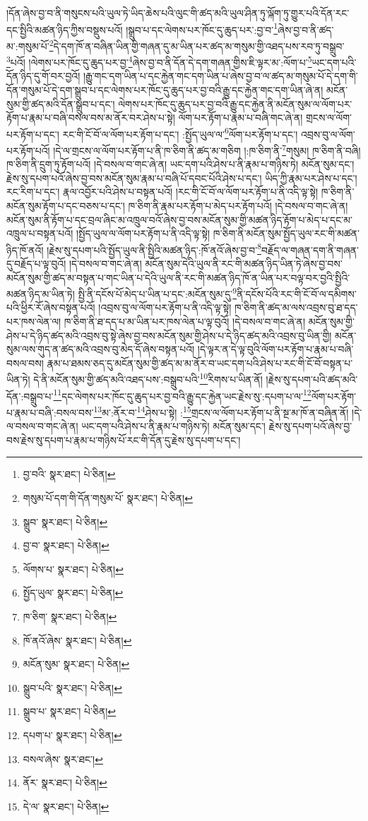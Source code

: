 །དོན་ཞེས་བྱ་བ་ནི་གསུངས་པའི་ཡུལ་ཏེ་ཡིད་ཆེས་པའི་ལུང་གི་ཚད་མའི་ཡུལ་ཤིན་ཏུ་ལྐོག་ཏུ་གྱུར་པའི་དོན་རང་དང་སྤྱིའི་མཚན་ཉིད་ཀྱིས་བསྡུས་པའོ། །སྒྲུབ་པ་དང་ལེགས་པར་ཁོང་དུ་ཆུད་པར་:བྱ་བ་\footnote{བྱ་བའི་  སྣར་ཐང་།  པེ་ཅིན། }ཞེས་བྱ་བ་ནི་ཚད་མ་:གསུམ་པོ་\footnote{གསུམ་པོ་དག་གི་དོན་གསུམ་པོ་  སྣར་ཐང་།  པེ་ཅིན། }དེ་དག་ཁོ་ན་བཞིན་ཡིན་གྱི་གཞན་དུ་མ་ཡིན་པར་ཚད་མ་གསུམ་གྱི་འཐད་པས་རབ་ཏུ་བསྒྲུབ་\footnote{སྒྲུབ་  སྣར་ཐང་།  པེ་ཅིན། }པའོ། །ལེགས་པར་ཁོང་དུ་ཆུད་པར་བྱ་\footnote{བྱ་བ་  སྣར་ཐང་།  པེ་ཅིན། }ཞེས་བྱ་བ་ནི་དོན་དེ་དག་གཞན་གྱིས་ཇི་ལྟར་མ་:ལོག་པ་\footnote{ལོགས་པ་  སྣར་ཐང་།  པེ་ཅིན། }ཡང་དག་པའི་དོན་ཉིད་དུ་གོ་བར་བྱའོ། །རྒྱུ་གང་དག་ཡིན་པ་དང་རྐྱེན་གང་དག་ཡིན་པ་ཞེས་བྱ་བ་ལ་ཚད་མ་གསུམ་པོ་དེ་དག་གི་དོན་གསུམ་པོ་དེ་དག་སྒྲུབ་པ་དང་ལེགས་པར་ཁོང་དུ་ཆུད་པར་བྱ་བའི་རྒྱུ་དང་རྐྱེན་གང་དག་ཡིན་ཞེ་ན། མངོན་སུམ་གྱི་ཚད་མའི་དོན་སྒྲུབ་པ་དང་། ལེགས་པར་ཁོང་དུ་ཆུད་པར་བྱ་བའི་རྒྱུ་དང་རྐྱེན་ནི་མངོན་སུམ་ལ་ལོག་པར་རྟོག་པ་རྣམ་པ་བཞི་བསལ་བས་མ་ནོར་བར་ཤེས་པ་སྟེ། ལོག་པར་རྟོག་པ་རྣམ་པ་བཞི་གང་ཞེ་ན། གྲངས་ལ་ལོག་པར་རྟོག་པ་དང་། རང་གི་ངོ་བོ་ལ་ལོག་པར་རྟོག་པ་དང་། :སྤྱོད་ཡུལ་ལ་\footnote{སྤྱོད་ཡུལ་  སྣར་ཐང་།  པེ་ཅིན། }ལོག་པར་རྟོག་པ་དང་། འབྲས་བུ་ལ་ལོག་པར་རྟོག་པའོ། །དེ་ལ་གྲངས་ལ་ལོག་པར་རྟོག་པ་ནི་ཁ་ཅིག་ནི་ཚད་མ་གཅིག །:ཁ་ཅིག་ནི་\footnote{ཁ་ཅིག་  སྣར་ཐང་།  པེ་ཅིན། }གསུམ། ཁ་ཅིག་ནི་བཞི། ཁ་ཅིག་ནི་དྲུག་ཏུ་རྟོག་པའོ། །དེ་བསལ་བ་གང་ཞེ་ན། ཡང་དག་པའི་ཤེས་པ་ནི་རྣམ་པ་གཉིས་ཏེ། མངོན་སུམ་དང་། རྗེས་སུ་དཔག་པའོ་ཞེས་བྱ་བས་མངོན་སུམ་རྣམ་པ་བཞི་པོ་དབང་པོའི་ཤེས་པ་དང་། ཡིད་ཀྱི་རྣམ་པར་ཤེས་པ་དང་། རང་རིག་པ་དང་། རྣལ་འབྱོར་པའི་ཤེས་པ་བསྟན་པའོ། །རང་གི་ངོ་བོ་ལ་ལོག་པར་རྟོག་པ་ནི་འདི་ལྟ་སྟེ། ཁ་ཅིག་ནི་མངོན་སུམ་རྟོག་པ་དང་བཅས་པ་དང་། ཁ་ཅིག་ནི་རྣམ་པར་རྟོག་པ་མེད་པར་རྟོག་པའོ། །དེ་བསལ་བ་གང་ཞེ་ན། མངོན་སུམ་ནི་རྟོག་པ་དང་བྲལ་ཞིང་མ་འཁྲུལ་བའོ་ཞེས་བྱ་བས་མངོན་སུམ་གྱི་མཚན་ཉིད་རྟོག་པ་མེད་པ་དང་མ་འཁྲུལ་པ་བསྟན་པའོ། །སྤྱོད་ཡུལ་ལ་ལོག་པར་རྟོག་པ་ནི་འདི་ལྟ་སྟེ། ཁ་ཅིག་ནི་མངོན་སུམ་སྤྱོད་ཡུལ་རང་གི་མཚན་ཉིད་ཁོ་ནའོ། །རྗེས་སུ་དཔག་པའི་སྤྱོད་ཡུལ་ནི་སྤྱིའི་མཚན་ཉིད་:ཁོ་ནའོ་ཞེས་བྱ་བ་\footnote{ཁོ་ནའོ་ཞེས་  སྣར་ཐང་།  པེ་ཅིན། }བརྗོད་ལ་གཞན་དག་ནི་གཞན་དུ་བརྗོད་པ་ལྟ་བུའོ། །དེ་བསལ་བ་གང་ཞེ་ན། མངོན་སུམ་དེའི་ཡུལ་ནི་རང་གི་མཚན་ཉིད་ཡིན་ཏེ་ཞེས་བྱ་བས་མངོན་སུམ་གྱི་ཚད་མ་བསྟན་པ་གང་ཡིན་པ་དེའི་ཡུལ་ནི་རང་གི་མཚན་ཉིད་ཁོ་ན་ཡིན་པར་བལྟ་བར་བྱའི་སྤྱིའི་མཚན་ཉིད་མ་ཡིན་ཏེ། སྤྱི་ནི་དངོས་པོ་མེད་པ་ཡིན་པ་དང་:མངོན་སུམ་དུ་\footnote{མངོན་སུམ་  སྣར་ཐང་།  པེ་ཅིན། }ནི་དངོས་པོའི་རང་གི་ངོ་བོ་ལ་དམིགས་པའི་ཕྱིར་རོ་ཞེས་བསྟན་པའོ། །འབྲས་བུ་ལ་ལོག་པར་རྟོག་པ་ནི་འདི་ལྟ་སྟེ། ཁ་ཅིག་ནི་ཚད་མ་ལས་འབྲས་བུ་ཐ་དད་པར་ཁས་ལེན་ལ། ཁ་ཅིག་ནི་ཐ་དད་པ་མ་ཡིན་པར་ཁས་ལེན་པ་ལྟ་བུའོ། །དེ་བསལ་བ་གང་ཞེ་ན། མངོན་སུམ་གྱི་ཤེས་པ་དེ་ཉིད་ཚད་མའི་འབྲས་བུ་སྟེ་ཞེས་བྱ་བས་མངོན་སུམ་གྱི་ཤེས་པ་དེ་ཉིད་ཚད་མའི་འབྲས་བུ་ཡིན་གྱི། མངོན་སུམ་ལས་གུད་ན་ཚད་མའི་འབྲས་བུ་མེད་དོ་ཞེས་བསྟན་པའོ། །དེ་ལྟར་ན་དེ་ལྟ་བུའི་ལོག་པར་རྟོག་པ་རྣམ་པ་བཞི་བསལ་བས། རྣམ་པ་ཐམས་ཅད་དུ་མངོན་སུམ་གྱི་ཚད་མ་མ་ནོར་བ་ཡང་དག་པའི་ཤེས་པ་རང་གི་ངོ་བོ་བསྟན་པ་ཡིན་ཏེ། དེ་ནི་མངོན་སུམ་གྱི་ཚད་མའི་འཐད་པས་:བསྒྲུབ་པའི་\footnote{སྒྲུབ་པའི་  སྣར་ཐང་།  པེ་ཅིན། }རིགས་པ་ཡིན་ནོ། །རྗེས་སུ་དཔག་པའི་ཚད་མའི་དོན་:བསྒྲུབ་པ་\footnote{སྒྲུབ་པ་  སྣར་ཐང་།  པེ་ཅིན། }དང་ལེགས་པར་ཁོང་དུ་ཆུད་པར་བྱ་བའི་རྒྱུ་དང་རྐྱེན་ཡང་རྗེས་སུ་:དཔག་པ་ལ་\footnote{དཔག་པ་  སྣར་ཐང་།  པེ་ཅིན། }ལོག་པར་རྟོག་པ་རྣམ་པ་བཞི་:བསལ་བས་\footnote{བསལ་ཞེས་  སྣར་ཐང་། }མ་:ནོར་བ་\footnote{ནོར་  སྣར་ཐང་།  པེ་ཅིན། }ཤེས་པ་སྟེ། :\footnote{དེ་ལ་  སྣར་ཐང་།  པེ་ཅིན། }གྲངས་ལ་ལོག་པར་རྟོག་པ་ནི་སྔ་མ་ཁོ་ན་བཞིན་ནོ། །དེ་ལ་བསལ་བ་གང་ཞེ་ན། ཡང་དག་པའི་ཤེས་པ་ནི་རྣམ་པ་གཉིས་ཏེ། མངོན་སུམ་དང་། རྗེས་སུ་དཔག་པའོ་ཞེས་བྱ་བས་རྗེས་སུ་དཔག་པ་རྣམ་པ་གཉིས་པོ་རང་གི་དོན་དུ་རྗེས་སུ་དཔག་པ་དང་། 